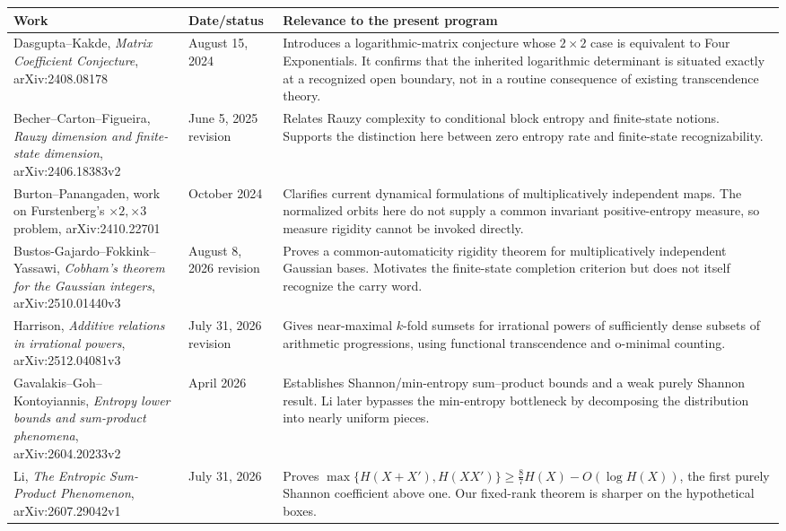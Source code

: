 \documentclass[11pt,oneside]{article}
\theoremstyle{definition}
\theoremstyle{remark}
\begin{document}
\begin{longtable}{p{}p{}p{}}
\toprule
\textbf{Work} & \textbf{Date/status} & \textbf{Relevance to the present program}\\
\midrule
Dasgupta--Kakde, \emph{Matrix Coefficient Conjecture}, arXiv:2408.08178 \cite{DasguptaKakde2024} & August 15, 2024 & Introduces a logarithmic-matrix conjecture whose \(2\times2\) case is equivalent to Four Exponentials.  It confirms that the inherited logarithmic determinant is situated exactly at a recognized open boundary, not in a routine consequence of existing transcendence theory.\\
Becher--Carton--Figueira, \emph{Rauzy dimension and finite-state dimension}, arXiv:2406.18383v2 \cite{BecherCartonFigueira2025} & June 5, 2025 revision & Relates Rauzy complexity to conditional block entropy and finite-state notions.  Supports the distinction here between zero entropy rate and finite-state recognizability.\\
Burton--Panangaden, work on Furstenberg's \(\times2,\times3\) problem, arXiv:2410.22701 \cite{BurtonPanangaden2024} & October 2024 & Clarifies current dynamical formulations of multiplicatively independent maps.  The normalized orbits here do not supply a common invariant positive-entropy measure, so measure rigidity cannot be invoked directly.\\
Bustos-Gajardo--Fokkink--Yassawi, \emph{Cobham's theorem for the Gaussian integers}, arXiv:2510.01440v3 \cite{BustosFokkinkYassawi2026} & August 8, 2026 revision & Proves a common-automaticity rigidity theorem for multiplicatively independent Gaussian bases.  Motivates the finite-state completion criterion but does not itself recognize the carry word.\\
Harrison, \emph{Additive relations in irrational powers}, arXiv:2512.04081v3 \cite{Harrison2026} & July 31, 2026 revision & Gives near-maximal \(k\)-fold sumsets for irrational powers of sufficiently dense subsets of arithmetic progressions, using functional transcendence and o-minimal counting.\\
Gavalakis--Goh--Kontoyiannis, \emph{Entropy lower bounds and sum-product phenomena}, arXiv:2604.20233v2 \cite{GavalakisGohKontoyiannis2026} & April 2026 & Establishes Shannon/min-entropy sum--product bounds and a weak purely Shannon result.  Li later bypasses the min-entropy bottleneck by decomposing the distribution into nearly uniform pieces.\\
Li, \emph{The Entropic Sum-Product Phenomenon}, arXiv:2607.29042v1 \cite{Li2026} & July 31, 2026 & Proves \(\max\{H(X+X'),H(XX')\}\geq\frac87H(X)-O(\log H(X))\), the first purely Shannon coefficient above one.  Our fixed-rank theorem is sharper on the hypothetical boxes.\\

\end{longtable}
\end{document}
